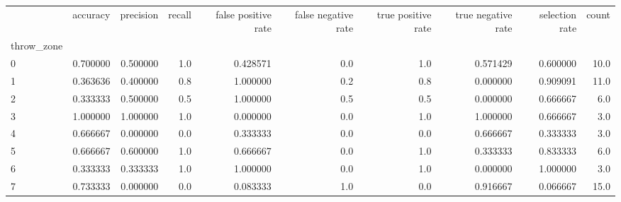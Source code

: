 \begin{tabular}{lrrrrrrrrr}
\toprule
{} &  accuracy &  precision &  recall &  false positive rate &  false negative rate &  true positive rate &  true negative rate &  selection rate &  count \\
throw\_zone &           &            &         &                      &                      &                     &                     &                 &        \\
\midrule
0          &  0.700000 &   0.500000 &     1.0 &             0.428571 &                  0.0 &                 1.0 &            0.571429 &        0.600000 &   10.0 \\
1          &  0.363636 &   0.400000 &     0.8 &             1.000000 &                  0.2 &                 0.8 &            0.000000 &        0.909091 &   11.0 \\
2          &  0.333333 &   0.500000 &     0.5 &             1.000000 &                  0.5 &                 0.5 &            0.000000 &        0.666667 &    6.0 \\
3          &  1.000000 &   1.000000 &     1.0 &             0.000000 &                  0.0 &                 1.0 &            1.000000 &        0.666667 &    3.0 \\
4          &  0.666667 &   0.000000 &     0.0 &             0.333333 &                  0.0 &                 0.0 &            0.666667 &        0.333333 &    3.0 \\
5          &  0.666667 &   0.600000 &     1.0 &             0.666667 &                  0.0 &                 1.0 &            0.333333 &        0.833333 &    6.0 \\
6          &  0.333333 &   0.333333 &     1.0 &             1.000000 &                  0.0 &                 1.0 &            0.000000 &        1.000000 &    3.0 \\
7          &  0.733333 &   0.000000 &     0.0 &             0.083333 &                  1.0 &                 0.0 &            0.916667 &        0.066667 &   15.0 \\
\bottomrule
\end{tabular}

